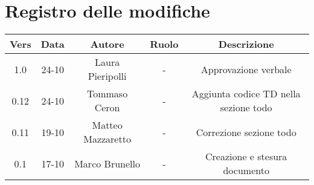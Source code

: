 \section{Registro delle modifiche}

\begin{table}[htbp]
	\begin{tabular}{|c|c|c|c|c|}
		\hline
		\rowcolor[gray]{0.9}
		Vers & Data & Autore & Ruolo & Descrizione \\
		\hline
		1.0 & 24-10 & Laura Pieripolli & - & Approvazione verbale \\
		\hline
		0.12 & 24-10 & Tommaso Ceron & - & Aggiunta codice TD nella sezione todo \\
		\hline
		0.11 & 19-10 & Matteo Mazzaretto & - & Correzione sezione todo \\
		\hline
		0.1 & 17-10 & Marco Brunello & - & Creazione e stesura documento \\
		\hline
	\end{tabular}
\end{table}